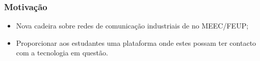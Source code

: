 \begin{frame}
	\frametitle{Motivaç\~{a}o}
	\begin{itemize}
		\item Nova cadeira sobre redes de comunicaç\~{a}o industriais de no MEEC/FEUP;
		\item Proporcionar aos estudantes uma plataforma onde estes possam ter contacto com a tecnologia em quest\~{a}o.
	\end{itemize}
\end{frame}
